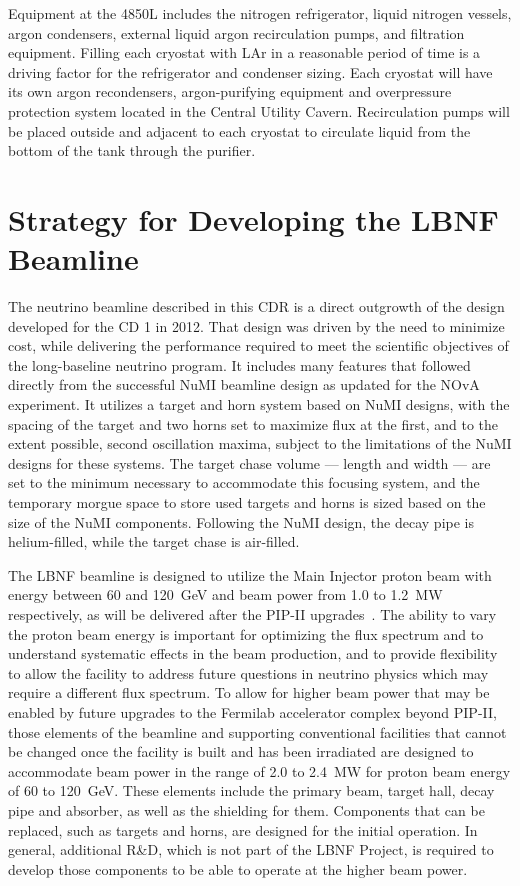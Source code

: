 Equipment at the 4850L includes the nitrogen refrigerator, liquid nitrogen vessels, argon condensers, external liquid argon recirculation pumps, and filtration equipment. Filling each cryostat with LAr in a reasonable period of time is a driving factor for the refrigerator and condenser sizing.  Each cryostat will have its own argon recondensers, argon-purifying equipment and overpressure protection system located in the Central Utility Cavern. Recirculation pumps will be placed outside and adjacent to each cryostat to circulate liquid from the bottom of the tank through the purifier.
 
 
\section{Strategy for Developing the LBNF Beamline}
 
The neutrino beamline described in this CDR is a direct outgrowth of the design~\cite{lbnecdr} developed for the 
CD 1 in 2012.  That design was driven by the need to minimize cost, while delivering the performance required to meet the scientific objectives of the long-baseline neutrino program.  It includes many features that followed directly from the 
successful NuMI beamline design as updated for the NOvA experiment.  It utilizes a target and horn system based on NuMI designs, with the spacing of the target and two horns set to maximize flux at the first, and to the extent possible, second 
oscillation maxima, subject to the limitations of  the NuMI designs for these systems.  The target chase volume --- length and width --- are set to the minimum necessary to accommodate this focusing system, and the temporary morgue space to store 
used targets and horns is sized based on the size of the NuMI components.  Following the NuMI design, the decay pipe is helium-filled, while the target chase is air-filled.  
 
The LBNF beamline is designed to utilize the Main Injector proton beam with energy between 60 and 120~GeV and beam power from 1.0 to 1.2~MW respectively, as will be delivered after the PIP-II upgrades~\cite{pip2-2013}.  The ability to vary the 
proton beam energy is important for optimizing the flux spectrum and to understand systematic effects in the beam production, and to provide flexibility to allow the facility to address future questions in neutrino physics which may require a 
different flux spectrum.  To allow for higher beam power that may be enabled by future upgrades to the Fermilab accelerator complex beyond PIP-II, those elements of the beamline and supporting conventional facilities that cannot be changed once 
the facility is built and has been irradiated are designed to accommodate beam power in the range of 2.0 to 2.4~MW for proton beam energy of 60 to 120~GeV.  These elements include the primary beam, target hall, decay pipe and absorber, as 
well as the shielding for them.  Components that can be replaced, such as targets and horns, are designed for the  initial operation.  In general, additional R\&D, which is not part of the LBNF Project, is required to develop those components to be able to operate at the higher beam power.
 

